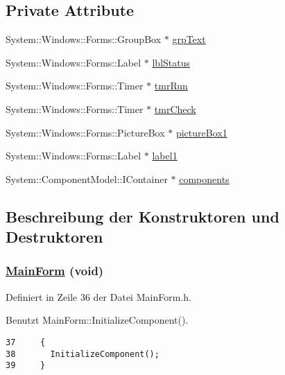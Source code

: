 \subsection*{Private Attribute}
\begin{CompactItemize}
\item 
System::Windows::Forms::Group\-Box $\ast$ \hyperlink{classQbeNDI_1_1MainForm_QbeNDI_1_1MainFormr0}{grp\-Text}
\item 
System::Windows::Forms::Label $\ast$ \hyperlink{classQbeNDI_1_1MainForm_QbeNDI_1_1MainFormr1}{lbl\-Status}
\item 
System::Windows::Forms::Timer $\ast$ \hyperlink{classQbeNDI_1_1MainForm_QbeNDI_1_1MainFormr2}{tmr\-Run}
\item 
System::Windows::Forms::Timer $\ast$ \hyperlink{classQbeNDI_1_1MainForm_QbeNDI_1_1MainFormr3}{tmr\-Check}
\item 
System::Windows::Forms::Picture\-Box $\ast$ \hyperlink{classQbeNDI_1_1MainForm_QbeNDI_1_1MainFormr4}{picture\-Box1}
\item 
System::Windows::Forms::Label $\ast$ \hyperlink{classQbeNDI_1_1MainForm_QbeNDI_1_1MainFormr5}{label1}
\item 
System::Component\-Model::IContainer $\ast$ \hyperlink{classQbeNDI_1_1MainForm_QbeNDI_1_1MainFormr6}{components}
\end{CompactItemize}


\subsection{Beschreibung der Konstruktoren und Destruktoren}
\hypertarget{classQbeNDI_1_1MainForm_QbeNDI_1_1MainForma0}{
\subsubsection[MainForm]{\setlength{\rightskip}{0pt plus 5cm}\hyperlink{classQbeNDI_1_1MainForm}{Main\-Form} (void)}}
\label{classQbeNDI_1_1MainForm_QbeNDI_1_1MainForma0}




Definiert in Zeile 36 der Datei Main\-Form.h.

Benutzt Main\-Form::Initialize\-Component().



\footnotesize\begin{verbatim}37     {
38       InitializeComponent();
39     }
\end{verbatim}\normalsize 


